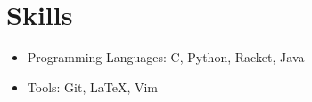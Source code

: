 \documentclass[a4paper,11pt]{article}
\newcommand{\resumeItem}[1]{
	\item\small{
		{#1 \vspace{-2pt}}
	}
}
\newcommand{\resumeItemListStart}{\begin{itemize}\OpenSansRegular}
\newcommand{\resumeItemListEnd}{\end{itemize}\vspace{-5pt}}
\begin{document}




\section{Skills}
\resumeItemListStart
\resumeItem{Programming Languages: C, Python, Racket, Java}
\resumeItem{Tools: Git, LaTeX, Vim}
\resumeItemListEnd

\end{document}
